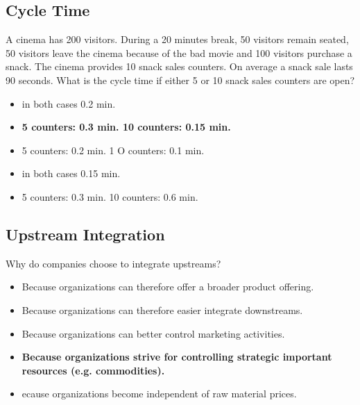 \subsection{Cycle Time}
A cinema has 200 visitors. During a 20 minutes break, 50 visitors remain seated, 50 visitors leave the cinema because of the bad movie and 100 visitors purchase a snack. The cinema provides 10 snack sales counters. On average a snack sale lasts 90 seconds. What is the cycle time if either 5 or 10 snack sales counters are open?

\begin{itemize}
\item in both cases 0.2 min.
\item \textbf{ 5 counters: 0.3 min. 10 counters: 0.15 min.}
\item  5 counters: 0.2 min. 1 O counters: 0.1 min.
\item  in both cases 0.15 min.
\item  5 counters: 0.3 min. 10 counters: 0.6 min.
\end{itemize}

\subsection{Upstream Integration}
Why do companies choose to integrate upstreams?\\
\begin{itemize}
\item Because organizations can therefore offer a broader product offering.
\item Because organizations can therefore easier integrate downstreams.
\item Because organizations can better control marketing activities.
\item \textbf{Because organizations strive for controlling strategic important resources (e.g. commodities).}
\item ecause organizations become independent of raw material prices.
\end{itemize}
